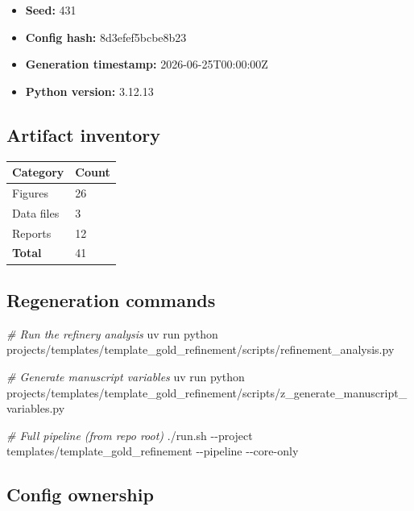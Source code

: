 \documentclass[
]{article}
\newenvironment{Shaded}{}{}
\newcommand{\AttributeTok}[1]{\textcolor[rgb]{0.49,0.56,0.16}{#1}}
\newcommand{\CommentTok}[1]{\textcolor[rgb]{0.38,0.63,0.69}{\textit{#1}}}
\newcommand{\ExtensionTok}[1]{#1}
\newcommand{\NormalTok}[1]{#1}
\newcounter{none} %
\providecommand{\tightlist}{%
  \setlength{\itemsep}{0pt}\setlength{\parskip}{0pt}}
\begin{document}
\begin{itemize}
\tightlist
\item
  \textbf{Seed:} 431
\item
  \textbf{Config hash:} 8d3efef5bcbe8b23
\item
  \textbf{Generation timestamp:} 2026-06-25T00:00:00Z
\item
  \textbf{Python version:} 3.12.13
\end{itemize}

\subsection{Artifact inventory}\label{artifact-inventory}

{\def\LTcaptype{none} %
\begin{longtable}[]{@{}ll@{}}
\toprule\noalign{}
Category & Count \\
\midrule\noalign{}
\endhead
\bottomrule\noalign{}
\endlastfoot
Figures & 26 \\
Data files & 3 \\
Reports & 12 \\
\textbf{Total} & 41 \\
\end{longtable}
}

\subsection{Regeneration commands}\label{regeneration-commands}

\begin{Shaded}
\begin{Highlighting}[]
\CommentTok{\# Run the refinery analysis}
\ExtensionTok{uv}\NormalTok{ run python projects/templates/template\_gold\_refinement/scripts/refinement\_analysis.py}

\CommentTok{\# Generate manuscript variables}
\ExtensionTok{uv}\NormalTok{ run python projects/templates/template\_gold\_refinement/scripts/z\_generate\_manuscript\_variables.py}

\CommentTok{\# Full pipeline (from repo root)}
\ExtensionTok{./run.sh} \AttributeTok{{-}{-}project}\NormalTok{ templates/template\_gold\_refinement }\AttributeTok{{-}{-}pipeline} \AttributeTok{{-}{-}core{-}only}
\end{Highlighting}
\end{Shaded}

\subsection{Config ownership}\label{config-ownership}
\end{document}
